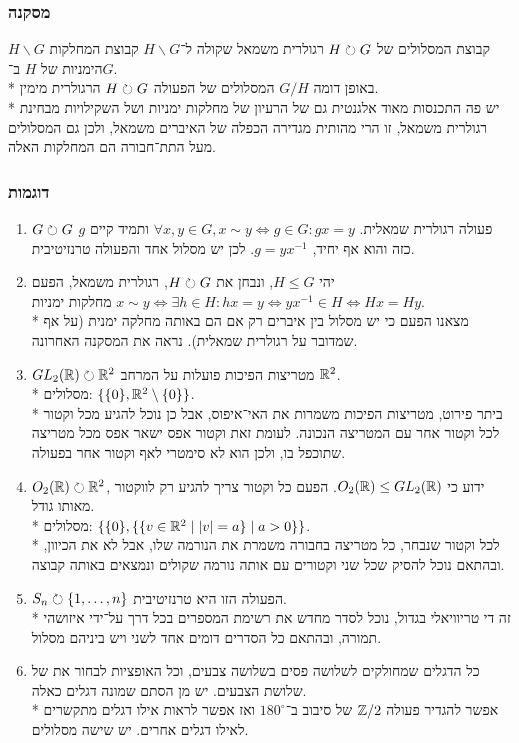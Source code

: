 \subsubsection{מסקנה}
$H \backslash G$ קבוצת המסלולים של $H \circlearrowright G$ רגולרית משמאל שקולה ל־$H \backslash G$ קבוצת המחלקות הימניות של $H$ ב־$G$.\\*
באופן דומה $G / H$ המסלולים של הפעולה $H \circlearrowright G$ הרגולרית מימין. \\*
יש פה התכנסות מאוד אלגנטית גם של הרעיון של מחלקות ימניות ושל השקילויות מבחינת רגולרית משמאל, זו הרי מהותית מגדירה הכפלה של האיברים משמאל, ולכן גם המסלולים מעל התת־חבורה הם המחלקות האלה.

\subsubsection{דוגמות}
\begin{enumerate}
	\item $G \circlearrowright G$ פעולה רגולרית שמאלית. $\forall x, y \in G, x \sim y \iff g \in G : gx = y$ ותמיד קיים $g$ כזה והוא אף יחיד, $g = yx^{-1}$. לכן יש מסלול אחד והפעולה טרנזיטיבית.
	\item יהי $H \le G$, ונבחן את $H \circlearrowright G$, רגולרית משמאל, הפעם $x \sim y \iff \exists h \in H : hx = y \iff yx^{-1} \in H \iff Hx = Hy$ מחלקות ימניות. \\*
		מצאנו הפעם כי יש מסלול בין איברים רק אם הם באותה מחלקה ימנית (על אף שמדובר על רגולרית שמאלית). נראה את המסקנה האחרונה.
	\item $GL_2(\mathbb{R}) \circlearrowright \mathbb{R}^2$ מטריצות הפיכות פועלות על המרחב $\mathbb{R}^2$. \\*
		מסלולים: $\{ \{ 0 \}, \mathbb{R}^2 \setminus \{ 0 \} \}$.\\*
		ביתר פירוט, מטריצות הפיכות משמרות את האי־איפוס, אבל כן נוכל להגיע מכל וקטור לכל וקטור אחר עם המטריצה הנכונה.
		לעומת זאת וקטור אפס ישאר אפס מכל מטריצה שתוכפל בו, ולכן הוא לא סימטרי לאף וקטור אחר בפעולה.
	\item $O_2(\mathbb{R}) \circlearrowright \mathbb{R}^2$, ידוע כי $O_2(\mathbb{R}) \le GL_2(\mathbb{R})$. הפעם כל וקטור צריך להגיע רק לווקטור מאותו גודל.\\*
		מסלולים: $\{ \{0\}, \{ \{ v \in \mathbb{R}^2 \mid |v| = a\} \mid a > 0 \} \}$. \\*
		לכל וקטור שנבחר, כל מטריצה בחבורה משמרת את הנורמה שלו, אבל לא את הכיוון, ובהתאם נוכל להסיק שכל שני וקטורים עם אותה נורמה שקולים ונמצאים באותה קבוצה.
	\item $S_n \circlearrowright \{1, \dots, n\}$ הפעולה הזו היא טרנזיטיבית. \\*
		זה די טריוויאלי בגדול, נוכל לסדר מחדש את רשימת המספרים בכל דרך על־ידי איזושהי תמורה, ובהתאם כל הסדרים דומים אחד לשני ויש ביניהם מסלול.
	\item כל הדגלים שמחולקים לשלושה פסים בשלושה צבעים, וכל האופציות לבחור את של שלושת הצבעים. יש מן הסתם שמונה דגלים כאלה.\\*
		אפשר להגדיר פעולה $\mathbb{Z}/2$ של סיבוב ב־$180^\circ$ ואז אפשר לראות אילו דגלים מתקשרים לאילו דגלים אחרים. יש שישה מסלולים.
\end{enumerate}

